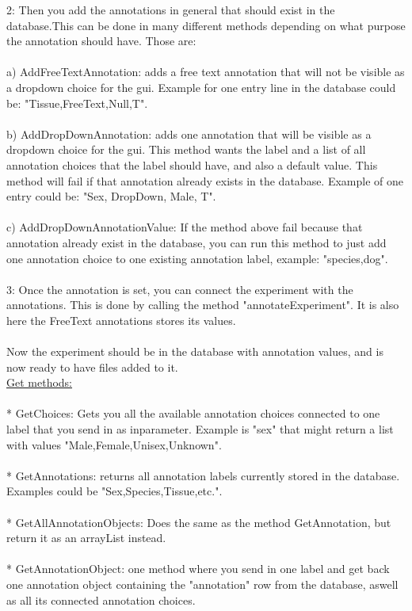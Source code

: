 \documentclass[a4paper]{report}
\begin{document}
2: Then you add the annotations in general that should exist in the database.This can be done in many different methods depending on what purpose the annotation should have. Those are:\\
\\
a) AddFreeTextAnnotation: adds a free text annotation that will not be visible as a dropdown choice for the gui. Example for one entry line in the database could be: "Tissue,FreeText,Null,T".\\
\\
b) AddDropDownAnnotation: adds one annotation that will be visible as a dropdown choice for the gui. This method wants the label and a list of all annotation choices that the label should have, and also a default value. This method will fail if that annotation already exists in the database. Example of one entry could be: "Sex, DropDown, Male, T".\\
\\
c) AddDropDownAnnotationValue: If the method above fail because that annotation already exist in the database, you can run this method to just add one annotation choice to one existing annotation label, example: "species,dog".\\
\\
3: Once the annotation is set, you can connect the experiment with the annotations. This is done by calling the method "annotateExperiment". It is also here the FreeText annotations stores its values.\\
\\
Now the experiment should be in the database with annotation values, and is now ready to have files added to it.\\
\newpage
\underline{Get methods:}\\
\\
* GetChoices: Gets you all the available annotation choices connected to one label that you send in as inparameter. Example is "sex" that might return a list with values "Male,Female,Unisex,Unknown".\\
\\
* GetAnnotations: returns all annotation labels currently stored in the database. Examples could be "Sex,Species,Tissue,etc.".\\
\\
* GetAllAnnotationObjects: Does the same as the method GetAnnotation, but return it as an arrayList instead.\\
\\
* GetAnnotationObject: one method where you send in one label and get back one annotation object containing the "annotation" row  from the database, aswell as all its connected annotation choices.\\
\end{document}
